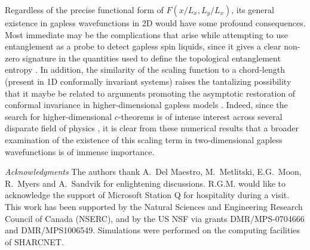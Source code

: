 \documentclass[prl,aps,twocolumn,floatfix,amsmath,amssymb,superscriptaddress,tightenlines]{revtex4}
\begin{document}
Regardless of the precise functional form of $F(x/L_x,L_y/L_x)$, its general existence in gapless wavefunctions in 2D would have some profound consequences.  
Most immediate may be the complications that arise while attempting to use entanglement as a probe to detect gapless spin liquids, since it gives a clear non-zero signature in the quantities used to define the topological entanglement entropy \cite{KP,LW}.
In addition, the similarity of the scaling function to a chord-length (present in 1D conformally invariant systems) 
raises the tantalizing possibility that it maybe be related to arguments promoting the asymptotic restoration of conformal invariance in higher-dimensional gapless models \cite{Shredder}.  
Indeed, since the search for higher-dimensional $c$-theorems is of intense interest across several disparate field of physics \cite{Zamo,ryu,Myers},
it is clear from these numerical results that a broader examination of the existence of this scaling term in two-dimensional gapless 
wavefunctions is of immense importance.

{\it Acknowledgments} 
The authors thank A.~Del Maestro, M.~Metlitski, E.G.~Moon, R.~Myers and A.~Sandvik for enlightening discussions. 
R.G.M. would like to acknowledge the support of Microsoft Station Q for hospitality during a visit.
This work has been supported by the Natural Sciences and Engineering
Research Council of Canada (NSERC), and by the US NSF via grants DMR/MPS-0704666 and DMR/MPS1006549.  Simulations were performed on the computing facilities of SHARCNET.



\end{document}
